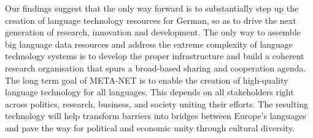 \begin{multicols}{2}
Our findings suggest that the only way forward is to substantially step up the creation of language technology resources for German, so as to drive the next generation of research, innovation and development. The only way to assemble big language data resources and address the extreme complexity of language technology systems is to develop the proper infrastructure and build a coherent research organisation that spurs a broad-based sharing and cooperation agenda. \\
The long term goal of META-NET is to enable the creation of high-quality language technology for all languages. This depends on all stakeholders right across politics, research, business, and society uniting their efforts. The resulting technology will help transform barriers into bridges between Europe’s languages and pave the way for political and economic unity through cultural diversity.

\end{multicols}

\clearpage

